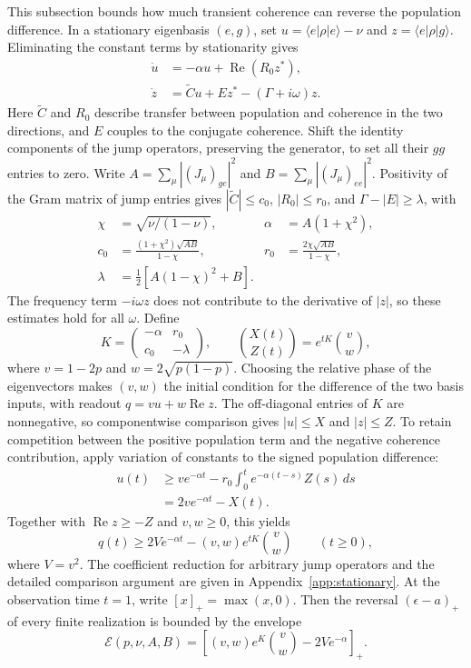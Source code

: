 \documentclass[aps,pra,reprint,amsmath,amssymb,nofootinbib,floatfix,longbibliography]{revtex4-2}
\theoremstyle{aps}
\newcommand{\eps}{\epsilon}
\newcommand{\pos}[1]{\left[#1\right]_+}
\newcommand{\ket}[1]{|#1\rangle}
\newcommand{\bra}[1]{\langle#1|}
\begin{document}
This subsection bounds how much transient coherence can reverse the population difference. In a stationary eigenbasis $(e,g)$, set $u=\bra e\rho\ket e-\nu$ and $z=\bra e\rho\ket g$. Eliminating the constant terms by stationarity gives
\begin{equation}\label{eq:core-system}
 \begin{aligned}
 \dot u&=-\alpha u+\operatorname{Re}(R_0z^*),\\
 \dot z&=\widetilde C u+Ez^*-(\Gamma+i\omega)z .
 \end{aligned}
\end{equation}
Here $\widetilde C$ and $R_0$ describe transfer between population and coherence in the two directions, and $E$ couples to the conjugate coherence. Shift the identity components of the jump operators, preserving the generator, to set all their $gg$ entries to zero. Write $A=\sum_\mu|(J_\mu)_{ge}|^2$ and $B=\sum_\mu|(J_\mu)_{ee}|^2$. Positivity of the Gram matrix of jump entries gives $|\widetilde C|\le c_0$, $|R_0|\le r_0$, and $\Gamma-|E|\ge\lambda$, with
\[
 \begin{aligned}
 \chi&=\sqrt{\nu/(1-\nu)}, &\alpha&=A(1+\chi^2),\\
 c_0&=\frac{(1+\chi^2)\sqrt{AB}}{1-\chi},&
 r_0&=\frac{2\chi\sqrt{AB}}{1-\chi},\\
 \lambda&=\tfrac12[A(1-\chi)^2+B].&&
 \end{aligned}
\]
The frequency term $-i\omega z$ does not contribute to the derivative of $|z|$, so these estimates hold for all $\omega$. Define
\[
 K=\begin{pmatrix}-\alpha&r_0\\c_0&-\lambda\end{pmatrix},
 \qquad \binom{X(t)}{Z(t)}=e^{tK}\binom vw ,
\]
where $v=1-2p$ and $w=2\sqrt{p(1-p)}$. Choosing the relative phase of the eigenvectors makes $(v,w)$ the initial condition for the difference of the two basis inputs, with readout $q=vu+w\operatorname{Re}z$. The off-diagonal entries of $K$ are nonnegative, so componentwise comparison gives $|u|\le X$ and $|z|\le Z$. To retain competition between the positive population term and the negative coherence contribution, apply variation of constants to the signed population difference:
\[
 \begin{aligned}
 u(t)&\ge ve^{-\alpha t}
       -r_0\int_0^t e^{-\alpha(t-s)}Z(s)\,ds\\
     &=2ve^{-\alpha t}-X(t).
 \end{aligned}
\]
Together with $\operatorname{Re}z\ge-Z$ and $v,w\ge0$, this yields
\begin{equation}\label{eq:comparison}
 q(t)\ge 2Ve^{-\alpha t}-(v,w)e^{tK}\binom vw
 \qquad(t\ge0),
\end{equation}
where $V=v^2$. The coefficient reduction for arbitrary jump operators and the detailed comparison argument are given in Appendix~\ref{app:stationary}. At the observation time $t=1$, write $[x]_+=\max(x,0)$. Then the reversal $(\eps-a)_+$ of every finite realization is bounded by the envelope
\begin{equation}\label{eq:envelope}
 \mathcal E(p,\nu,A,B)=\pos{(v,w)e^K\binom vw-2Ve^{-\alpha}}.
\end{equation}
\end{document}
